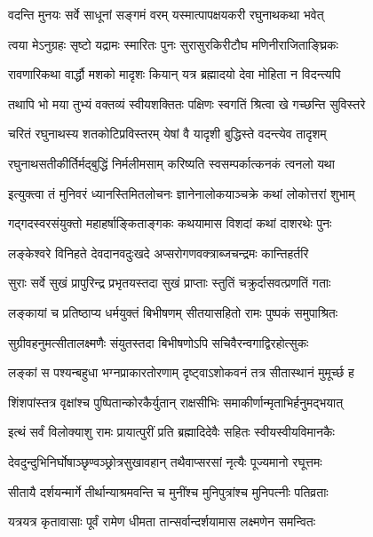 \twolineshloka
{वदन्ति मुनयः सर्वे साधूनां सङ्गमं वरम्}
{यस्मात्पापक्षयकरी रघुनाथकथा भवेत्}%

\twolineshloka
{त्वया मेऽनुग्रहः सृष्टो यद्रामः स्मारितः पुनः}
{सुरासुरकिरीटौघ मणिनीराजिताङ्घ्रिकः}%

\twolineshloka
{रावणारिकथा वार्द्धौ मशको मादृशः कियान्}
{यत्र ब्रह्मादयो देवा मोहिता न विदन्त्यपि}%

\twolineshloka
{तथापि भो मया तुभ्यं वक्तव्यं स्वीयशक्तितः}
{पक्षिणः स्वगतिं श्रित्वा खे गच्छन्ति सुविस्तरे}%

\twolineshloka
{चरितं रघुनाथस्य शतकोटिप्रविस्तरम्}
{येषां वै यादृशी बुद्धिस्ते वदन्त्येव तादृशम्}%

\twolineshloka
{रघुनाथसतीकीर्तिर्मद्बुद्धिं निर्मलीमसाम्}
{करिष्यति स्वसम्पर्कात्कनकं त्वनलो यथा}%


\twolineshloka
{इत्युक्त्वा तं मुनिवरं ध्यानस्तिमितलोचनः}
{ज्ञानेनालोकयाञ्चक्रे कथां लोकोत्तरां शुभाम्}%

\twolineshloka
{गद्गदस्वरसंयुक्तो महाहर्षाङ्किताङ्गकः}
{कथयामास विशदां कथां दाशरथेः पुनः}%


\twolineshloka
{लङ्केश्वरे विनिहते देवदानवदुःखदे}
{अप्सरोगणवक्त्राब्जचन्द्रमः कान्तिहर्तरि}%

\twolineshloka
{सुराः सर्वे सुखं प्रापुरिन्द्र प्रभृतयस्तदा}
{सुखं प्राप्ताः स्तुतिं चक्रुर्दासवत्प्रणतिं गताः}%

\twolineshloka
{लङ्कायां च प्रतिष्ठाप्य धर्मयुक्तं बिभीषणम्}
{सीतयासहितो रामः पुष्पकं समुपाश्रितः}%

\twolineshloka
{सुग्रीवहनुमत्सीतालक्ष्मणैः संयुतस्तदा}
{बिभीषणोऽपि सचिवैरन्वगाद्विरहोत्सुकः}%

\twolineshloka
{लङ्कां स पश्यन्बहुधा भग्नप्राकारतोरणाम्}
{दृष्ट्वाऽशोकवनं तत्र सीतास्थानं मुमूर्च्छ ह}%

\twolineshloka
{शिंशपांस्तत्र वृक्षांश्च पुष्पितान्कोरकैर्युतान्}
{राक्षसीभिः समाकीर्णान्मृताभिर्हनुमद्भयात्}%

\twolineshloka
{इत्थं सर्वं विलोक्याशु रामः प्रायात्पुरीं प्रति}
{ब्रह्मादिदेवैः सहितः स्वीयस्वीयविमानकैः}%

\twolineshloka
{देवदुन्दुभिनिर्घोषाञ्छृण्वञ्छ्रोत्रसुखावहान्}
{तथैवाप्सरसां नृत्यैः पूज्यमानो रघूत्तमः}%

\twolineshloka
{सीतायै दर्शयन्मार्गे तीर्थान्याश्रमवन्ति च}
{मुनींश्च मुनिपुत्रांश्च मुनिपत्नीः पतिव्रताः}%

\twolineshloka
{यत्रयत्र कृतावासाः पूर्वं रामेण धीमता}
{तान्सर्वान्दर्शयामास लक्ष्मणेन समन्वितः}%

